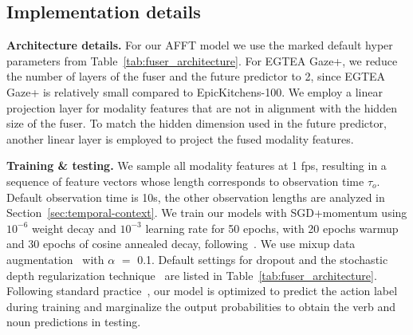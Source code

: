 \documentclass[10pt,twocolumn,letterpaper,dvipsnames]{article}
\newcommand{\sname}{AFFT}
\begin{document}
\subsection{Implementation details}
\label{sec:implementation}
\noindent\textbf{Architecture details.} For our \sname{} model we use the marked default hyper parameters from Table~\ref{tab:fuser_architecture}. For EGTEA Gaze+, we reduce the number of layers of the fuser and the future predictor to 2, since EGTEA Gaze+ is relatively small compared to EpicKitchens-100. We employ a linear projection layer for modality features that are not in alignment with the hidden size of the fuser. To match the hidden dimension used in the future predictor, another linear layer is employed to project the fused modality features.

\noindent\textbf{Training \& testing.}
We sample all modality features at 1 fps, resulting in a sequence of feature vectors whose length corresponds to observation time $\tau_o$. Default observation time is 10s, the other observation lengths are analyzed in Section~\ref{sec:temporal-context}. We train our models with SGD+momentum using $10^{-6}$ weight decay and $10^{-3}$ learning rate for 50 epochs, with 20 epochs warmup~\cite{goyal2017accurate} and 30 epochs of cosine annealed decay, following~\cite{girdharAnticipativeVideoTransformer2021}. We use mixup data augmentation~\cite{zhang2017mixup} with $\alpha$ $=$ 0.1. Default settings for dropout and the stochastic depth regularization technique~\cite{huang2016deep} are listed in Table~\ref{tab:fuser_architecture}. Following standard practice~\cite{furnariWhatWouldYou2019,girdharAnticipativeVideoTransformer2021,wuMeMViTMemoryAugmentedMultiscale2022}, our model is optimized to predict the action label during training and marginalize the output probabilities to obtain the verb and noun predictions in testing.
\end{document}

